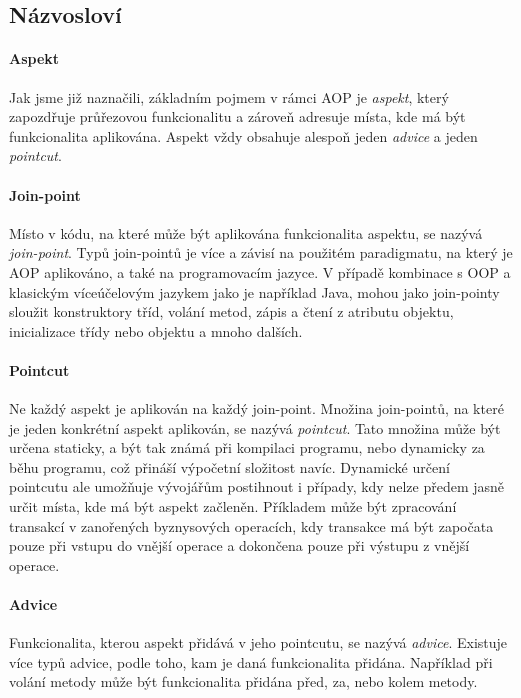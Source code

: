 \subsection{Názvosloví}

\paragraph{Aspekt}
Jak jsme již naznačili, základním pojmem v rámci \gls{AOP} je \textit{aspekt},
který zapozdřuje průřezovou funkcionalitu a zároveň adresuje místa, kde má být
funkcionalita aplikována. Aspekt vždy obsahuje alespoň jeden \textit{advice}
a jeden \textit{pointcut}.

\paragraph{Join-point}
Místo v kódu, na které může být aplikována funkcionalita aspektu, se nazývá
\textit{join-point}. Typů join-pointů je více a závisí na použitém paradigmatu,
na který je \gls{AOP} aplikováno, a také na programovacím jazyce. V případě
kombinace s \gls{OOP} a klasickým víceúčelovým jazykem jako je například Java,
mohou jako join-pointy sloužit konstruktory tříd, volání metod, zápis a čtení
z atributu objektu, inicializace třídy nebo objektu a mnoho dalších.

\paragraph{Pointcut}
Ne každý aspekt je aplikován na každý join-point. Množina join-pointů,
na které je jeden konkrétní aspekt aplikován, se nazývá \textit{pointcut}.
Tato množina může být určena staticky, a být tak známá při kompilaci programu, nebo
dynamicky za běhu programu, což přináší výpočetní složitost navíc.
Dynamické určení pointcutu ale umožňuje vývojářům postihnout i případy,
kdy nelze předem jasně určit místa, kde má být aspekt začleněn.
Příkladem může být zpracování transakcí v zanořených byznysových operacích,
kdy transakce má být započata pouze při vstupu do vnější operace
a dokončena pouze při výstupu z vnější operace.

\paragraph{Advice}
Funkcionalita, kterou aspekt přidává v jeho pointcutu, se nazývá
\textit{advice}. Existuje více typů advice, podle toho, kam je
daná funkcionalita přidána. Například při volání metody může
být funkcionalita přidána před, za, nebo kolem metody.


